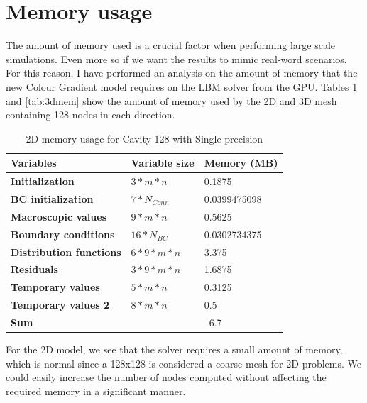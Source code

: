 \documentclass[12pt, openany]{book}
\begin{document}
\section{Memory usage}
The amount of memory used is a crucial factor when performing large scale simulations. Even more so if we want the results to mimic real-word scenarios. For this reason, I have performed an analysis on the amount of memory that the new Colour Gradient model requires on the LBM solver from the GPU. Tables \ref{tab:2dmem} and \ref{tab:3dmem} show the amount of memory used by the 2D and 3D mesh containing 128 nodes in each direction.
\begin{table}[H]
	\centering
	\begin{tabular}{|l|l|l|}
		\hline
		\textbf{Variables}              & \textbf{Variable size}   & \textbf{Memory (MB)} \\ \hline
		\textbf{Initialization}         & $3 * m * n$              & 0.1875               \\ \hline
		\textbf{BC initialization}      & $7 * N_{Conn}$           & 0.0399475098         \\ \hline
		\textbf{Macroscopic values}     & $9 * m * n$              & 0.5625               \\ \hline
		\textbf{Boundary conditions}    & $16 * N_{BC}$            & 0.0302734375         \\ \hline
		\textbf{Distribution functions} & $6 * 9 * m * n$          & 3.375                \\ \hline
		\textbf{Residuals}              & $3 * 9 * m * n$          & 1.6875               \\ \hline
		\textbf{Temporary values}       & $5 * m * n$              & 0.3125               \\ \hline
		\textbf{Temporary values 2}     & $8 * m * n $        	   & 0.5                    \\ \hline
		\textbf{Sum}                    &                          & ~6.7         \\ \hline
	\end{tabular}	
	\caption{2D memory usage for Cavity 128 with Single precision}
	\label{tab:2dmem}
\end{table}

For the 2D model, we see that the solver requires a small amount of memory, which is normal since a 128x128 is considered a coarse mesh for 2D problems. We could easily increase the number of nodes computed without affecting the required memory in a significant manner. 
\end{document}
